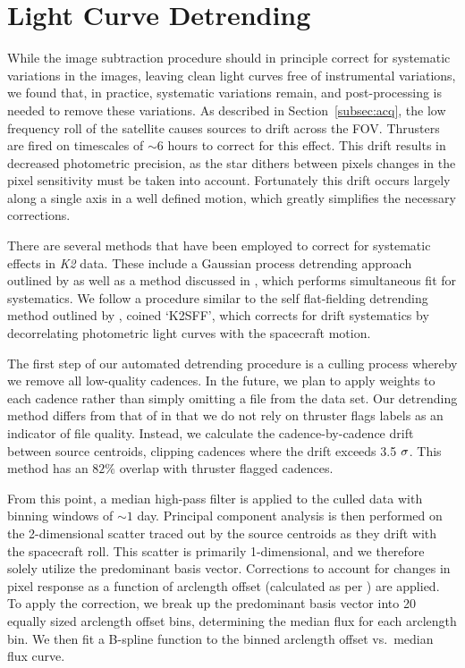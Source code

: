 \documentclass[apjl]{emulateapj}
\begin{document}
\section{Light Curve Detrending}
\label{sec_detrend}
  
While the image subtraction procedure should in principle correct for
systematic variations in the images, leaving clean light curves free of
instrumental variations, we found that, in practice, systematic
variations remain, and post-processing is needed to remove these
variations.  As described in Section~\ref{subsec:acq}, the low frequency
roll of the satellite causes sources to drift across the FOV.  Thrusters
are fired on timescales of $\sim 6$ hours to correct for this
effect. This drift results in decreased photometric precision, as the
star dithers between pixels changes in the pixel sensitivity must be
taken into account. Fortunately this drift occurs largely along a single
axis in a well defined motion, which greatly simplifies the necessary
corrections.

There are several methods that have been employed to correct for
systematic effects in \textit{K2} data. These include a Gaussian process
detrending approach outlined by \citet{Aigrain:2015} as well as a method
discussed in \citet{FM:2015}, which performs simultaneous fit for
systematics.  We follow a procedure similar to the self flat-fielding
detrending method outlined by \citet{vanderburg_johnson:2014}, coined
`K2SFF', which corrects for drift systematics by decorrelating
photometric light curves with the spacecraft motion.


The first step of our automated detrending procedure is a culling
process whereby we remove all low-quality cadences. In the future, we
plan to apply weights to each cadence rather than simply omitting a file
from the data set. Our detrending method differs from that of
\citet{vanderburg_johnson:2014} in that we do not rely on thruster flags
labels as an indicator of file quality. Instead, we calculate the
cadence-by-cadence drift between source centroids, clipping cadences
where the drift exceeds 3.5 $\rm \sigma$. This method has an $82 \%$
overlap with thruster flagged cadences.

From this point, a median high-pass filter is applied to the culled data
with binning windows of $\sim 1$ day.  Principal component analysis is
then performed on the 2-dimensional scatter traced out by the source
centroids as they drift with the spacecraft roll.  This scatter is
primarily 1-dimensional, and we therefore solely utilize the predominant
basis vector. Corrections to account for changes in pixel response as a
function of arclength offset (calculated as per
\citealp{vanderburg_johnson:2014}) are applied.  To apply the
correction, we break up the predominant basis vector into 20 equally
sized arclength offset bins, determining the median flux for each
arclength bin. We then fit a B-spline function to the binned arclength
offset vs.\ median flux curve.
\end{document}
